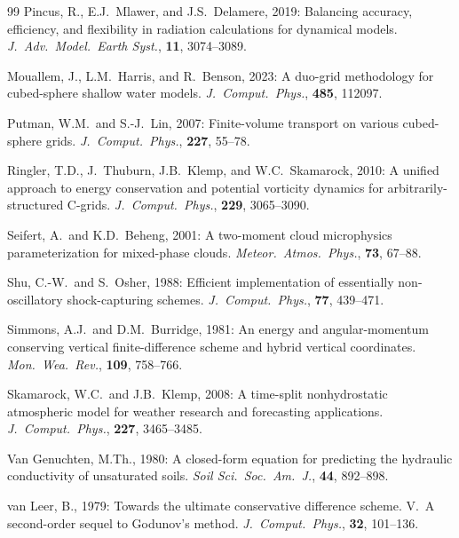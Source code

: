 \documentclass[11pt,twoside]{report}
\begin{document}
\begin{thebibliography}{99}
Pincus, R., E.J.~Mlawer, and J.S.~Delamere, 2019:
Balancing accuracy, efficiency, and flexibility in radiation calculations
for dynamical models.
\textit{J.\ Adv.\ Model.\ Earth Syst.}, \textbf{11}, 3074--3089.

Mouallem, J., L.M.~Harris, and R.~Benson, 2023:
A duo-grid methodology for cubed-sphere shallow water models.
\textit{J.\ Comput.\ Phys.}, \textbf{485}, 112097.

Putman, W.M.\ and S.-J.~Lin, 2007:
Finite-volume transport on various cubed-sphere grids.
\textit{J.\ Comput.\ Phys.}, \textbf{227}, 55--78.

Ringler, T.D., J.~Thuburn, J.B.~Klemp, and W.C.~Skamarock, 2010:
A unified approach to energy conservation and potential vorticity dynamics
for arbitrarily-structured C-grids.
\textit{J.\ Comput.\ Phys.}, \textbf{229}, 3065--3090.

Seifert, A.\ and K.D.~Beheng, 2001:
A two-moment cloud microphysics parameterization for mixed-phase clouds.
\textit{Meteor.\ Atmos.\ Phys.}, \textbf{73}, 67--88.

Shu, C.-W.\ and S.~Osher, 1988:
Efficient implementation of essentially non-oscillatory shock-capturing
schemes.
\textit{J.\ Comput.\ Phys.}, \textbf{77}, 439--471.

Simmons, A.J.\ and D.M.~Burridge, 1981:
An energy and angular-momentum conserving vertical finite-difference
scheme and hybrid vertical coordinates.
\textit{Mon.\ Wea.\ Rev.}, \textbf{109}, 758--766.

Skamarock, W.C.\ and J.B.~Klemp, 2008:
A time-split nonhydrostatic atmospheric model for weather research and
forecasting applications.
\textit{J.\ Comput.\ Phys.}, \textbf{227}, 3465--3485.

Van Genuchten, M.Th., 1980:
A closed-form equation for predicting the hydraulic conductivity of
unsaturated soils.
\textit{Soil Sci.\ Soc.\ Am.\ J.}, \textbf{44}, 892--898.

van Leer, B., 1979:
Towards the ultimate conservative difference scheme. V.\ A second-order
sequel to Godunov's method.
\textit{J.\ Comput.\ Phys.}, \textbf{32}, 101--136.


\end{thebibliography}
\end{document}
